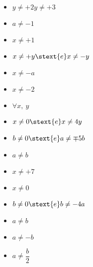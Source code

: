 \begin{esercizio}
\begin{htmulticols}{3}
\begin{itemize} [label={\framebox(12,12){}}]
\item \(y \neq +2 y \neq +3\)
\item \(a \neq -1\)
\item \(x \neq +1\)
\item \(x \neq +y \stext{e} x \neq -y\)
\item \(x \neq -a\)
\item \(x \neq -2\)
\item \(\forall x,~y\)
\item \(x \neq 0 \stext{e} x \neq 4y\)
\item \(b \neq 0 \stext{e} a \neq \mp 5b\)
\item \(a \neq b\)
\item \(x \neq +7\)
\item \(x \neq 0\)
\item \(b \neq 0 \stext{e} b \neq -4a\)
\item \(a \neq b\)
\item \(a \neq -b\)
\item \(a \neq \dfrac{b}{2}\)
\end{itemize}
\end{htmulticols}
\end{esercizio}

\subsubsection*{}

